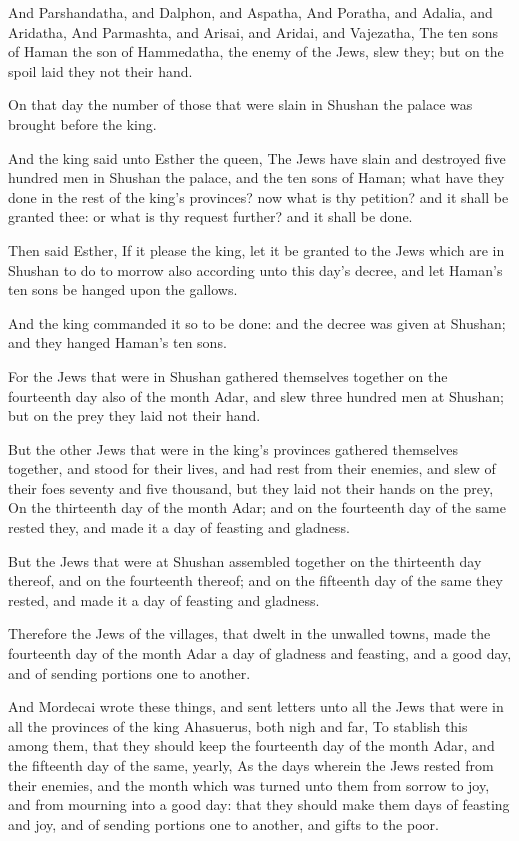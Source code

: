 \verse And Parshandatha, and Dalphon, and Aspatha, \verse And Poratha, and Adalia, and Aridatha, \verse And Parmashta, and Arisai, and Aridai, and Vajezatha, \verse The ten sons of Haman the son of Hammedatha, the enemy of the Jews, slew they; but on the spoil laid they not their hand.

\verse On that day the number of those that were slain in Shushan the palace was brought before the king.

\verse And the king said unto Esther the queen, The Jews have slain and destroyed five hundred men in Shushan the palace, and the ten sons of Haman; what have they done in the rest of the king's provinces? now what is thy petition? and it shall be granted thee: or what is thy request further? and it shall be done.

\verse Then said Esther, If it please the king, let it be granted to the Jews which are in Shushan to do to morrow also according unto this day's decree, and let Haman's ten sons be hanged upon the gallows.

\verse And the king commanded it so to be done: and the decree was given at Shushan; and they hanged Haman's ten sons.

\verse For the Jews that were in Shushan gathered themselves together on the fourteenth day also of the month Adar, and slew three hundred men at Shushan; but on the prey they laid not their hand.

\verse But the other Jews that were in the king's provinces gathered themselves together, and stood for their lives, and had rest from their enemies, and slew of their foes seventy and five thousand, but they laid not their hands on the prey, \verse On the thirteenth day of the month Adar; and on the fourteenth day of the same rested they, and made it a day of feasting and gladness.

\verse But the Jews that were at Shushan assembled together on the thirteenth day thereof, and on the fourteenth thereof; and on the fifteenth day of the same they rested, and made it a day of feasting and gladness.

\verse Therefore the Jews of the villages, that dwelt in the unwalled towns, made the fourteenth day of the month Adar a day of gladness and feasting, and a good day, and of sending portions one to another.

\verse And Mordecai wrote these things, and sent letters unto all the Jews that were in all the provinces of the king Ahasuerus, both nigh and far, \verse To stablish this among them, that they should keep the fourteenth day of the month Adar, and the fifteenth day of the same, yearly, \verse As the days wherein the Jews rested from their enemies, and the month which was turned unto them from sorrow to joy, and from mourning into a good day: that they should make them days of feasting and joy, and of sending portions one to another, and gifts to the poor.

